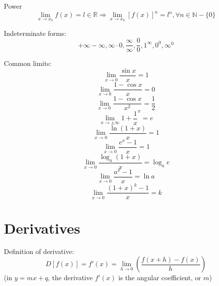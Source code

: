 \documentclass{article}
\begin{document}
Power
\begin{equation}
\lim_{x\to{x_0}} f(x) = l \in \mathbb{R} \Rightarrow \lim_{x\to{x_0}} [f(x)]^n = l^n, \forall n\in \mathbb{N} - \{0\}
\end{equation}

Indeterminate forms:
\begin{equation}
+\infty - \infty, \infty \cdot 0, \frac{\infty}{\infty}, \frac{0}{0}, 1^{\infty}, 0^0, \infty^0
\end{equation}

Common limits:
\begin{equation}
\lim_{x\to0} \frac{\sin{x}}{x} = 1
\end{equation}
\begin{equation}
\lim_{x\to0} \frac{1-\cos{x}}{x} = 0
\end{equation}
\begin{equation}
\lim_{x\to0} \frac{1-\cos{x}}{x^2} = \frac{1}{2}
\end{equation}
\begin{equation}
\lim_{x\to\pm\infty}1+\frac{1}{x}^x=e
\end{equation}
\begin{equation}
\lim_{x\to0}\frac{\ln{(1+x)}}{x}=1
\end{equation}
\begin{equation}
\lim_{x\to0}\frac{e^x-1}{x}=1
\end{equation}
\begin{equation}
\lim_{x\to0}\frac{\log_a{(1+x)}}{x}=\log_a{e}
\end{equation}
\begin{equation}
\lim_{x\to0}\frac{a^x-1}{x}=\ln{a}
\end{equation}
\begin{equation}
\lim_{x\to0}\frac{(1+x)^k-1}{x}=k
\end{equation}


\section{Derivatives}

Definition of derivative:
\begin{equation}
D[f(x)] = f'(x) = \lim_{h\to0}(\frac{f(x+h)-f(x)}{h})
\end{equation}
(in $y=mx + q$, the derivative $f'(x)$ is the angular coefficient, or $m$)
\end{document}
